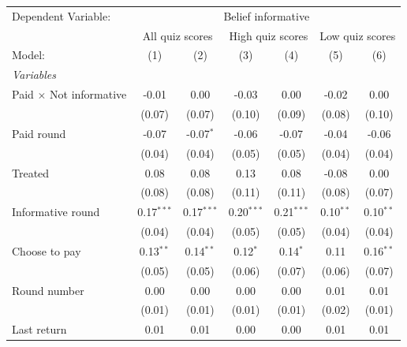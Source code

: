 \begingroup
\centering
\begin{tabular}{lcccccc}
   \tabularnewline \midrule \midrule
   Dependent Variable: & \multicolumn{6}{c}{Belief informative}\\
    & \multicolumn{2}{c}{All quiz scores} & \multicolumn{2}{c}{High quiz scores} & \multicolumn{2}{c}{Low quiz scores} \\ 
   Model:                         & (1)          & (2)          & (3)          & (4)          & (5)           & (6)\\  
   \midrule
   \emph{Variables}\\
   Paid $\times$ Not informative  & -0.01        & 0.00         & -0.03        & 0.00         & -0.02         & 0.00\\   
                                  & (0.07)       & (0.07)       & (0.10)       & (0.09)       & (0.08)        & (0.10)\\   
   Paid round                     & -0.07        & -0.07$^{*}$  & -0.06        & -0.07        & -0.04         & -0.06\\   
                                  & (0.04)       & (0.04)       & (0.05)       & (0.05)       & (0.04)        & (0.04)\\   
   Treated                        & 0.08         & 0.08         & 0.13         & 0.08         & -0.08         & 0.00\\   
                                  & (0.08)       & (0.08)       & (0.11)       & (0.11)       & (0.08)        & (0.07)\\   
   Informative round              & 0.17$^{***}$ & 0.17$^{***}$ & 0.20$^{***}$ & 0.21$^{***}$ & 0.10$^{**}$   & 0.10$^{**}$\\   
                                  & (0.04)       & (0.04)       & (0.05)       & (0.05)       & (0.04)        & (0.04)\\   
   Choose to pay                  & 0.13$^{**}$  & 0.14$^{**}$  & 0.12$^{*}$   & 0.14$^{*}$   & 0.11          & 0.16$^{**}$\\   
                                  & (0.05)       & (0.05)       & (0.06)       & (0.07)       & (0.06)        & (0.07)\\   
   Round number                   & 0.00         & 0.00         & 0.00         & 0.00         & 0.01          & 0.01\\   
                                  & (0.01)       & (0.01)       & (0.01)       & (0.01)       & (0.02)        & (0.01)\\   
   Last return                    & 0.01         & 0.01         & 0.00         & 0.00         & 0.01          & 0.01\\   

\end{tabular}

